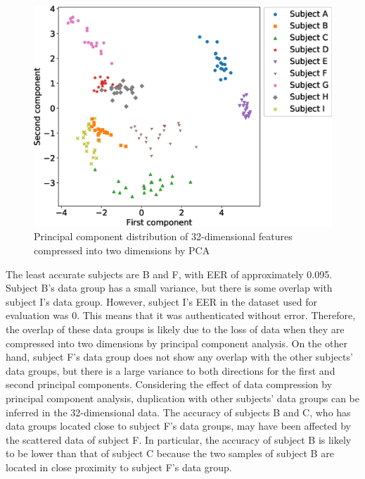 \documentclass[sigchi,authordraft]{acmart}
\newcommand\figref[1]{\textbf{Figure~\ref{fig:#1}}}
\begin{document}

\begin{figure}[!t]
  \centering
    \includegraphics[width=1\linewidth]{figure/PCA.eps}
  \caption{Principal component distribution of 32-dimensional features compressed into two dimensions by PCA}
  \label{fig:PCA}
\end{figure}

The least accurate subjects are B and F, with EER of approximately 0.095. Subject B's data group has a small variance, but there is some overlap with subject I's data group. However, subject I's EER in the dataset used for evaluation was 0. This means that it was authenticated without error. Therefore, the overlap of these data groups is likely due to the loss of data when they are compressed into two dimensions by principal component analysis. On the other hand, subject F's data group does not show any overlap with the other subjects' data groups, but there is a large variance to both directions for the first and second principal components. Considering the effect of data compression by principal component analysis, duplication with other subjects' data groups can be inferred in the 32-dimensional data. The accuracy of subjects B and C, who has data groups located close to subject F's data groups, may have been affected by the scattered data of subject F. In particular, the accuracy of subject B is likely to be lower than that of subject C because the two samples of subject B are located in close proximity to subject F's data group.\par
\end{document}
